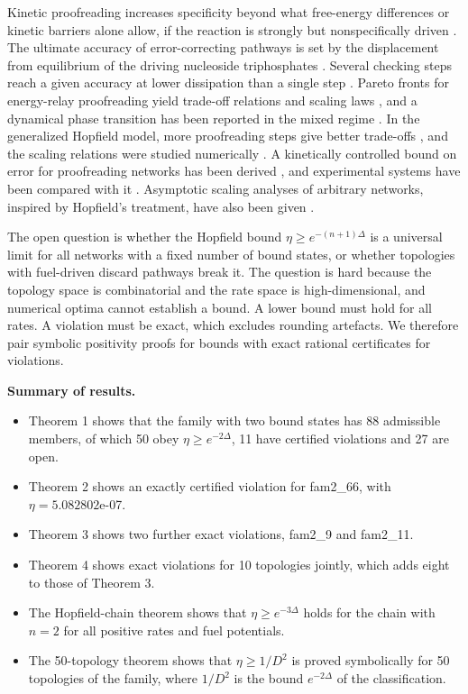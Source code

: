 \documentclass[10pt,twocolumn]{article}
\providecommand{\tightlist}{\setlength{\itemsep}{0pt}\setlength{\parskip}{0pt}}
\theoremstyle{definition}\newtheorem{definition}{Definition}\newtheorem{example}{Example}
\begin{document}
Kinetic proofreading increases specificity beyond what free-energy differences or kinetic barriers alone allow, if the reaction is strongly but nonspecifically driven \cite{Hopfield19744135}. The ultimate accuracy of error-correcting pathways is set by the displacement from equilibrium of the driving nucleoside triphosphates \cite{Ehrenberg19800636}. Several checking steps reach a given accuracy at lower dissipation than a single step \cite{Ehrenberg19800636}. Pareto fronts for energy-relay proofreading yield trade-off relations and scaling laws \cite{Berx20240232}, and a dynamical phase transition has been reported in the mixed regime \cite{Berx20240232}. In the generalized Hopfield model, more proofreading steps give better trade-offs \cite{Chiuchiu2023c757}, and the scaling relations were studied numerically \cite{Chiuchiu2023c757}. A kinetically controlled bound on error for proofreading networks has been derived \cite{Yu20220883}, and experimental systems have been compared with it \cite{Yu20220883}. Asymptotic scaling analyses of arbitrary networks, inspired by Hopfield's treatment, have also been given \cite{Wong201738v1}.

The open question is whether the Hopfield bound \(\eta \geq e^{-(n+1)\Delta}\) is a universal limit for all networks with a fixed number of bound states, or whether topologies with fuel-driven discard pathways break it. The question is hard because the topology space is combinatorial and the rate space is high-dimensional, and numerical optima cannot establish a bound. A lower bound must hold for all rates. A violation must be exact, which excludes rounding artefacts. We therefore pair symbolic positivity proofs for bounds with exact rational certificates for violations.

\textbf{Summary of results.}

\begin{itemize}
\tightlist
\item
  Theorem 1 shows that the family with two bound states has 88 admissible members, of which 50 obey \(\eta \geq e^{-2\Delta}\), 11 have certified violations and 27 are open.
\item
  Theorem 2 shows an exactly certified violation for fam2\_66, with \(\eta = 5.082802\)e-07.
\item
  Theorem 3 shows two further exact violations, fam2\_9 and fam2\_11.
\item
  Theorem 4 shows exact violations for 10 topologies jointly, which adds eight to those of Theorem 3.
\item
  The Hopfield-chain theorem shows that \(\eta \geq e^{-3\Delta}\) holds for the chain with \(n=2\) for all positive rates and fuel potentials.
\item
  The 50-topology theorem shows that \(\eta \geq 1/D^2\) is proved symbolically for 50 topologies of the family, where \(1/D^2\) is the bound \(e^{-2\Delta}\) of the classification.
\end{itemize}
\end{document}
